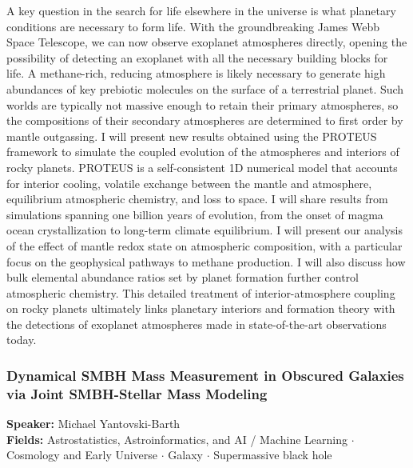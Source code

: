 A key question in the search for life elsewhere in the universe is what planetary conditions are necessary to form life. With the groundbreaking James Webb Space Telescope, we can now observe exoplanet atmospheres directly, opening the possibility of detecting an exoplanet with all the necessary building blocks for life. A methane-rich, reducing atmosphere is likely necessary to generate high abundances of key prebiotic molecules on the surface of a terrestrial planet. Such worlds are typically not massive enough to retain their primary atmospheres, so the compositions of their secondary atmospheres are determined to first order by mantle outgassing. I will present new results obtained using the PROTEUS framework to simulate the coupled evolution of the atmospheres and interiors of rocky planets. PROTEUS is a self-consistent 1D numerical model that accounts for interior cooling, volatile exchange between the mantle and atmosphere, equilibrium atmospheric chemistry, and loss to space. I will share results from simulations spanning one billion years of evolution, from the onset of magma ocean crystallization to long-term climate equilibrium. I will present our analysis of the effect of mantle redox state on atmospheric composition, with a particular focus on the geophysical pathways to methane production. I will also discuss how bulk elemental abundance ratios set by planet formation further control atmospheric chemistry. This detailed treatment of interior-atmosphere coupling on rocky planets ultimately links planetary interiors and formation theory with the detections of exoplanet atmospheres made in state-of-the-art observations today.

\hypertarget{abstract-talk-330}{}\label{abstract-page-talk-330}
\subsubsection*{Dynamical SMBH Mass Measurement in Obscured Galaxies via Joint SMBH-Stellar Mass Modeling}
\textbf{Speaker:} Michael Yantovski-Barth\\
\textbf{Fields:} Astrostatistics, Astroinformatics, and AI / Machine Learning $\cdot$ Cosmology and Early Universe $\cdot$ Galaxy $\cdot$ Supermassive black hole


